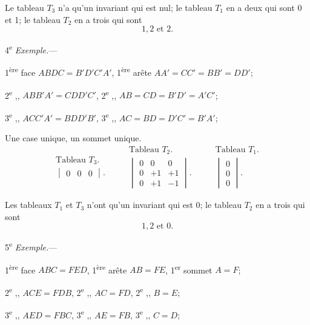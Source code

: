 \documentclass{article}
\begin{document}
Le tableau $T_{3}$ n'a qu'un invariant qui est nul; le tableau $T_{1}$ en a deux qui sont 0 et 1; le tableau $T_{2}$ en a trois qui sont
\[ 1, 2 \text{ et } 2. \]

4\textsuperscript{e} \emph{Exemple.}---

1\textsuperscript{ère} face $ABDC = B'D'C'A'$, 1\textsuperscript{ère} arête $AA' = CC' = BB' = DD'$;

2\textsuperscript{e} ,, $ABB'A' = CDD'C'$, 2\textsuperscript{e} ,, $AB = CD = B'D' = A'C'$;

3\textsuperscript{e} ,, $ACC'A' = BDD'B'$, 3\textsuperscript{e} ,, $AC = BD = D'C' = B'A'$;

Une case unique, un sommet unique.
\[ \begin{gathered} \text{Tableau } T_{3}. \\ \begin{vmatrix} 0 & 0 & 0 \end{vmatrix}. \end{gathered} \qquad \begin{gathered} \text{Tableau } T_{2}. \\ \begin{vmatrix} 0 & 0 & 0 \\[1ex] 0 & +1 & +1 \\[1ex] 0 & +1 & -1 \end{vmatrix}. \end{gathered} \qquad \begin{gathered} \text{Tableau } T_{1}. \\ \begin{vmatrix} 0 \\[1ex] 0 \\[1ex] 0 \end{vmatrix}. \end{gathered} \]

Les tableaux $T_{1}$ et $T_{3}$ n'ont qu'un invariant qui est 0; le tableau $T_{2}$ en a trois qui sont
\[ 1, 2 \text{ et } 0. \]

5\textsuperscript{e} \emph{Exemple.}---

1\textsuperscript{ère} face $ABC = FED$, 1\textsuperscript{ère} arête $AB = FE$, 1\textsuperscript{er} sommet $A = F$;

2\textsuperscript{e} ,, $ACE = FDB$, 2\textsuperscript{e} ,, $AC = FD$, 2\textsuperscript{e} ,, $B = E$;

3\textsuperscript{e} ,, $AED = FBC$, 3\textsuperscript{e} ,, $AE = FB$, 3\textsuperscript{e} ,, $C = D$;
\end{document}
